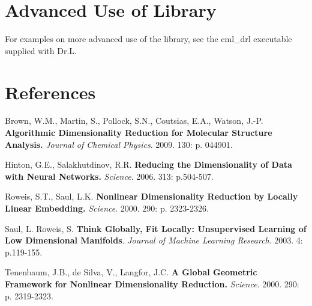 \par
 \par
 \hypertarget{index_advanced}{}\section{Advanced Use of Library}\label{index_advanced}
For examples on more advanced use of the library, see the cml\_\-drl executable supplied with Dr.L.

\par
 \par
 \hypertarget{index_ref}{}\section{References}\label{index_ref}
Brown, W.M., Martin, S., Pollock, S.N., Coutsias, E.A., Watson, J.-P. {\bf  Algorithmic Dimensionality Reduction for Molecular Structure Analysis.} {\em Journal of Chemical Physics\/}. 2009. 130: p. 044901.

Hinton, G.E., Salakhutdinov, R.R. {\bf Reducing the Dimensionality of Data with Neural Networks.} {\em Science\/}. 2006. 313: p.504-507.

Roweis, S.T., Saul, L.K. {\bf  Nonlinear Dimensionality Reduction by Locally Linear Embedding.} {\em Science\/}. 2000. 290: p. 2323-2326.

Saul, L. Roweis, S. {\bf Think Globally, Fit Locally: Unsupervised Learning of Low Dimensional Manifolds}. {\em Journal of Machine Learning Research\/}. 2003. 4: p.119-155.

Tenenbaum, J.B., de Silva, V., Langfor, J.C. {\bf A Global Geometric Framework for Nonlinear Dimensionality Reduction.} {\em Science\/}. 2000. 290: p. 2319-2323.

\par
 \par
 \par
 \par
 